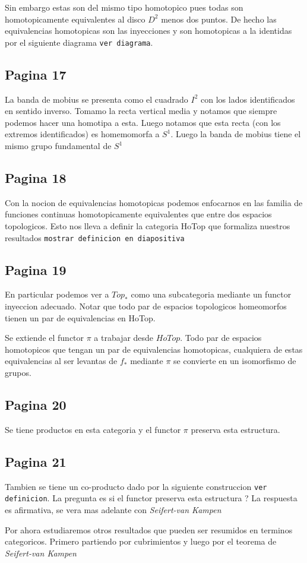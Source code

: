 \documentclass[letterpaper]{article}
\newcommand{\vank}{\emph{Seifert-van Kampen} }
\begin{document}
Sin embargo estas son del mismo tipo homotopico pues todas son
homotopicamente equivalentes al disco \(D^2\) menos dos puntos. De hecho
las equivalencias homotopicas son las inyecciones y son homotopicas a la
identidas por el siguiente diagrama \texttt{ver diagrama}.

\subsection*{Pagina 17}
La banda de mobius se presenta como el cuadrado \(I^2\) con los lados
identificados en sentido inverso. Tomamo la recta vertical media y
notamos que siempre podemos hacer una homotipa a esta. Luego notamos que
esta recta (con los extremos identificados) es homemomorfa a \(S^1\).
Luego la banda de mobius tiene el mismo grupo fundamental de \(S^1\)

\subsection*{Pagina 18}
Con la nocion de equivalencias homotopicas podemos enfocarnos en las
familia de funciones continuas homotopicamente equivalentes que entre
dos espacios topologicos. Esto nos lleva a definir la categoria HoTop
que formaliza nuestros resultados \texttt{mostrar definicion en
  diapositiva}

\subsection*{Pagina 19}
En particular podemos ver a \(Top_*\) como una subcategoria mediante un
functor inyeccion adecuado. Notar que todo par de espacios topologicos
homeomorfos tienen un par de equivalencias en HoTop.

Se extiende el functor \(\pi\) a trabajar desde \(HoTop\). Todo par de
espacios homotopicos que tengan un par de equivalencias homotopicas,
cualquiera de estas equivalencias al ser levantas de \(f_*\) mediante
\(\pi\) se convierte en un isomorfismo de grupos.

\subsection*{Pagina 20}
Se tiene productos en esta categoria y el functor \(\pi\) preserva esta
estructura.

\subsection*{Pagina 21}
Tambien se tiene un co-producto dado por la siguiente construccion
\texttt{ver definicion}. La pregunta es si el functor preserva esta
estructura ? La respuesta es afirmativa, se vera mas adelante con \vank

Por ahora estudiaremos otros resultados que pueden ser resumidos en
terminos categoricos. Primero partiendo por cubrimientos y luego por el
teorema de \vank
\end{document}
